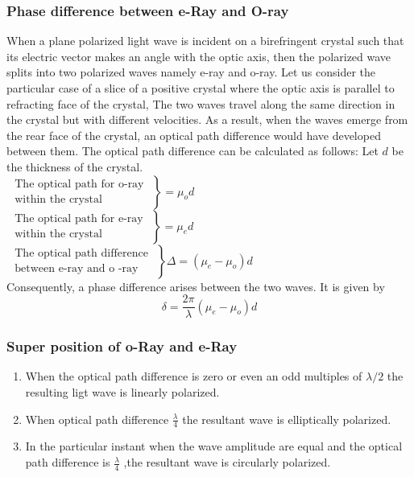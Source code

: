 \subsubsection{Phase difference between e-Ray and O-ray}
When a plane polarized light wave is incident on a birefringent crystal such that its electric vector makes an angle with the optic axis, then the polarized wave splits into two polarized waves namely e-ray and o-ray. Let us consider the particular case of a slice of a positive crystal where the optic axis is parallel to refracting face of the crystal, The two waves travel along the same direction in the crystal but with different velocities. As a result, when the waves emerge from the rear face of the crystal, an optical path difference would have developed between them. The optical path difference can be calculated as follows:
Let $d$ be the thickness of the crystal.\\
$\left.\begin{array}{l}\text { The optical path for o-ray } \\ \text { within the crystal }\end{array}\right\}=\mu_{o} d$\\
$\left.\begin{array}{l}\text { The optical path for e-ray } \\ \text { within the crystal }\end{array}\right\}=\mu_{e} d$\\
$\left.\begin{array}{l}\text { The optical path difference } \\ \text { between e-ray and o -ray }\end{array}\right\} \Delta=\left(\mu_{e}-\mu_{o}\right) d$\\
Consequently, a phase difference arises between the two waves. It is given by
$$
\delta=\frac{2 \pi}{\lambda}\left(\mu_{e}-\mu_{o}\right) d
$$
\subsubsection{Super position of o-Ray and e-Ray}
\begin{enumerate}
	\item When the optical path difference is zero or even an odd multiples of $\lambda/2$ the resulting ligt wave is linearly polarized.
	\item When optical path difference $\frac{\lambda}{4}$ the resultant wave is elliptically polarized.
	\item In the particular instant when the wave amplitude are equal and the optical path difference is $\frac{\lambda}{4}$ ,the resultant wave is circularly polarized.
\end{enumerate}
